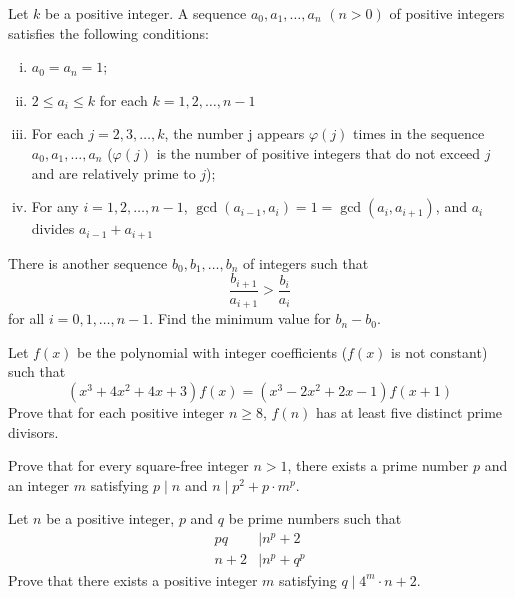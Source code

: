 \begin{problem}
	Let $k$ be a positive integer. A sequence $a_0, a_1, \dots, a_n$ $(n>0)$ of positive integers satisfies the following conditions:
	\begin{enumerate}[(i)]
		\item $a_0=a_n=1$;
		\item $2\leq a_i\leq k$ for each $k=1,2,\dots,n-1$
		\item For each $j=2,3,\dots,k$, the number j appears $\varphi (j)$ times in the sequence $a_0,a_1,\dots,a_n$ ($\varphi (j)$ is the number of positive integers that do not exceed $j$ and are relatively prime to $j$);
		\item For any $i=1,2,\dots,n-1$, $\gcd(a_{i-1},a_i)=1=\gcd(a_i,a_{i+1})$, and $a_i$ divides $a_{i-1}+a_{i+1}$
	\end{enumerate}
	There is another sequence $b_0,b_1,\dots,b_n$ of integers such that $$\frac{b_{i+1}}{a_{i+1}}>\frac{b_i}{a_i}$$ for all $i=0,1,\dots,n-1$. Find the minimum value for $b_n-b_0$. %
\end{problem}

\begin{problem}
	Let $f(x)$ be the polynomial with integer coefficients ($f(x)$ is not constant) such that
	\[(x^3+4x^2+4x+3)f(x)=(x^3-2x^2+2x-1)f(x+1)\]Prove that for each positive integer $n\geq8$, $f(n)$ has at least five distinct prime divisors. %
\end{problem}

\begin{problem}
	Prove that for every square-free integer $n>1$, there exists a prime number $p$ and an integer $m$ satisfying $p \mid n$ and $n \mid p^2+p\cdot m^p$.
\end{problem}

\begin{problem}
	Let $n$ be a positive integer, $p$ and $q$ be prime numbers such that
		\begin{align*}
			pq
				& \mid n^p+2\\
			n+2
				& \mid n^p+q^p
		\end{align*}
	Prove that there exists a positive integer $m$ satisfying $q \mid 4^m \cdot n +2$. %
\end{problem}


